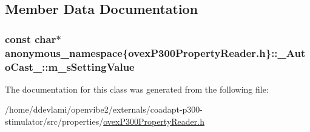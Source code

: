 \subsection{Member Data Documentation}
\hypertarget{classanonymous__namespace_02ovexP300PropertyReader_8h_03_1_1__AutoCast___aebc953a8d5731fdfdb315cbaffc17e44}{
\subsubsection[{m\_\-sSettingValue}]{\setlength{\rightskip}{0pt plus 5cm}const char$\ast$ anonymous\_\-namespace\{ovexP300PropertyReader.h\}::{\bf \_\-AutoCast\_\-::m\_\-sSettingValue}}}
\label{classanonymous__namespace_02ovexP300PropertyReader_8h_03_1_1__AutoCast___aebc953a8d5731fdfdb315cbaffc17e44}


The documentation for this class was generated from the following file:\begin{DoxyCompactItemize}
\item 
/home/ddevlami/openvibe2/externals/coadapt-\/p300-\/stimulator/src/properties/\hyperlink{ovexP300PropertyReader_8h}{ovexP300PropertyReader.h}\end{DoxyCompactItemize}
